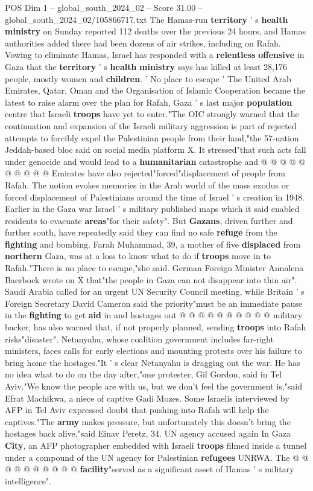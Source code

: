\begin{textsample}{POS Dim 1 – global\_south\_2024\_02 – Score 31.00 – global\_south\_2024\_02/105866717.txt}
The Hamas-run \textbf{territory} ' s \textbf{health} \textbf{ministry} on Sunday reported 112 deaths over the previous 24 hours, and Hamas authorities added there had been dozens of air strikes, including on Rafah.
Vowing to eliminate Hamas, Israel has responded with a \textbf{relentless} \textbf{offensive} in Gaza that the \textbf{territory} ' s \textbf{health} \textbf{ministry} says has killed at least 28,176 people, mostly women and \textbf{children}. ' No place to escape ' The United Arab Emirates, Qatar, Oman and the Organisation of Islamic Cooperation became the latest to raise alarm over the plan for Rafah, Gaza ' s last major \textbf{population} centre that Israeli \textbf{troops} have yet to enter."The OIC strongly warned that the continuation and expansion of the Israeli military aggression is part of rejected attempts to forcibly expel the Palestinian people from their land,"the 57-nation Jeddah-based bloc said on social media platform X.
It stressed"that such acts fall under genocide and would lead to a \textbf{humanitarian} catastrophe and @ @ @ @ @ @ @ @ @ @ Emirates have also rejected"forced"displacement of people from Rafah.
The notion evokes memories in the Arab world of the mass exodus or forced displacement of Palestinians around the time of Israel ' s creation in 1948.
Earlier in the Gaza war Israel ' s military published maps which it said enabled residents to evacuate \textbf{areas}"for their safety".
But \textbf{Gazans}, driven further and further south, have repeatedly said they can find no safe \textbf{refuge} from the \textbf{fighting} and bombing.
Farah Muhammad, 39, a mother of five \textbf{displaced} from \textbf{northern} Gaza, was at a loss to know what to do if \textbf{troops} move in to Rafah."There is no place to escape,"she said.
German Foreign Minister Annalena Baerbock wrote on X that"the people in Gaza can not disappear into thin air".
Saudi Arabia called for an urgent UN Security Council meeting, while Britain ' s Foreign Secretary David Cameron said the priority"must be an immediate pause in the \textbf{fighting} to get \textbf{aid} in and hostages out @ @ @ @ @ @ @ @ @ @ military backer, has also warned that, if not properly planned, sending \textbf{troops} into Rafah risks"disaster".
Netanyahu, whose coalition government includes far-right ministers, faces calls for early elections and mounting protests over his failure to bring home the hostages."It ' s clear Netanyahu is dragging out the war.
He has no idea what to do on the day after,"one protester, Gil Gordon, said in Tel Aviv."We know the people are with us, but we don't feel the government is,"said Efrat Machikwa, a niece of captive Gadi Mozes.
Some Israelis interviewed by AFP in Tel Aviv expressed doubt that pushing into Rafah will help the captives."The \textbf{army} makes pressure, but unfortunately this doesn't bring the hostages back alive,"said Einav Peretz, 34.
UN agency accused again In Gaza \textbf{City}, an AFP photographer embedded with Israeli \textbf{troops} filmed inside a tunnel under a compound of the UN agency for Palestinian \textbf{refugees} UNRWA.
The @ @ @ @ @ @ @ @ @ @ \textbf{facility}"served as a significant asset of Hamas ' s military intelligence".


\end{textsample}

